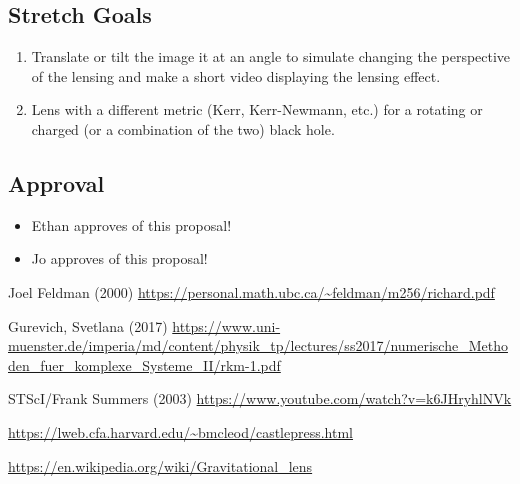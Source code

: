 \documentclass{article}
\begin{document}
\subsection*{Stretch Goals}
\begin{enumerate}
	\item Translate or tilt the image it at an angle to simulate changing the perspective of the lensing and make a short video displaying the lensing effect.
	\item Lens with a different metric (Kerr, Kerr-Newmann, etc.) for a rotating or charged (or a combination of the two) black hole. 
\end{enumerate}

\subsection*{Approval}
\begin{itemize}
	\item Ethan approves of this proposal!
	\item Jo approves of this proposal!
\end{itemize}

\newpage
\begin{thebibliography}{5}
	Joel Feldman (2000) \url{https://personal.math.ubc.ca/~feldman/m256/richard.pdf}
	
	Gurevich, Svetlana (2017) \url{https://www.uni-muenster.de/imperia/md/content/physik_tp/lectures/ss2017/numerische_Methoden_fuer_komplexe_Systeme_II/rkm-1.pdf}
	
	STScI/Frank Summers (2003) \url{https://www.youtube.com/watch?v=k6JHryhlNVk}
	
	\url{https://lweb.cfa.harvard.edu/~bmcleod/castlepress.html}
	
	\url{https://en.wikipedia.org/wiki/Gravitational_lens}
	
	
\end{thebibliography}
	
	
	
	
\end{document}
